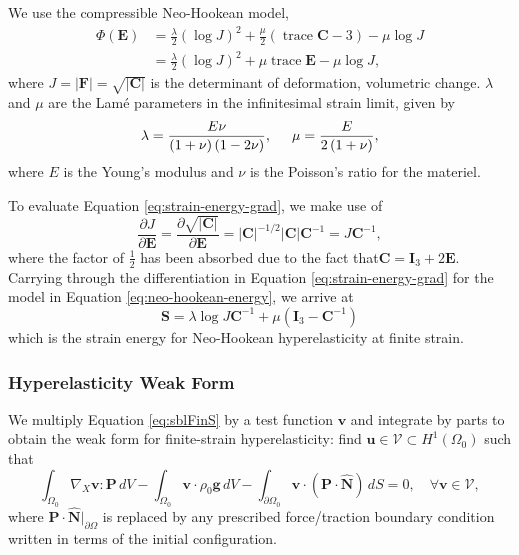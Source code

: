 We use the compressible Neo-Hookean model,
\begin{equation}
   \begin{aligned}
   \Phi \left( \mathbf E \right) &= \frac{\lambda}{2} \left( \log J \right)^2 + \frac \mu 2 \left(\operatorname{trace} \mathbf C - 3 \right) - \mu \log J \\
     &= \frac{\lambda}{2}\left( \log J \right)^2 + \mu \operatorname{trace} \mathbf E - \mu \log J,
   \end{aligned}
   \label{eq:neo-hookean-energy}
\end{equation}
where $J = \lvert \mathbf F \rvert = \sqrt{\lvert \mathbf C \rvert}$ is the determinant of deformation, volumetric change.
$\lambda$ and $\mu$ are the Lamé parameters in the infinitesimal strain limit, given by
\begin{equation}
\lambda = \frac{E \nu}{\left( 1 + \nu \right) \left( 1 - 2 \nu \right)}, \hspace{5mm}
\mu = \frac{E}{2 \left( 1 + \nu \right)},
\end{equation}
where $E$ is the Young's modulus and $\nu$ is the Poisson's ratio for the materiel.

To evaluate Equation \ref{eq:strain-energy-grad}, we make use of
\begin{equation}
   \frac{\partial J}{\partial \mathbf E} = \frac{\partial \sqrt{\lvert \mathbf C \rvert}}{\partial \mathbf E} = \lvert \mathbf C \rvert^{-1/2} \lvert \mathbf C \rvert \mathbf C^{-1} = J \mathbf C^{-1},
\end{equation}
where the factor of $\frac 1 2$ has been absorbed due to the fact that$\mathbf C = \mathbf I_3 + 2 \mathbf E$.
Carrying through the differentiation in Equation \ref{eq:strain-energy-grad} for the model in Equation \ref{eq:neo-hookean-energy}, we arrive at
\begin{equation}
   \mathbf S = \lambda \log J \mathbf C^{-1} + \mu (\mathbf I_3 - \mathbf C^{-1})
   \label{eq:neo-hookean-stress}
\end{equation}
which is the strain energy for Neo-Hookean hyperelasticity at finite strain.

\subsubsection{Hyperelasticity Weak Form}

We multiply Equation \ref{eq:sblFinS} by a test function $\mathbf v$ and integrate by parts to obtain the weak form for finite-strain hyperelasticity:
find $\mathbf u \in \mathcal V \subset H^1 \left( \Omega_0 \right)$ such that
\begin{equation}
    \int_{\Omega_0}{\nabla_X \mathbf{v} \!:\! \mathbf{P}} \, dV
    - \int_{\Omega_0}{\mathbf{v} \cdot \rho_0 \mathbf{g}} \, dV
    - \int_{\partial \Omega_0}{\mathbf{v} \cdot (\mathbf{P} \cdot \hat{\mathbf{N}})} \, dS
    = 0, \quad \forall \mathbf v \in \mathcal V,
   \label{eq:hyperelastic-weak-form-initial}
\end{equation}    
where $\mathbf{P} \cdot \hat{\mathbf{N}}|_{\partial\Omega}$ is replaced by any prescribed force/traction boundary condition written in terms of the initial configuration.

